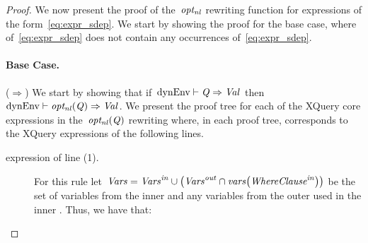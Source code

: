 \begin{proof}
  We now present the proof of the~$\mathit{opt_{nl}}$ rewriting function for expressions of the
  form~\eqref{eq:expr_sdep}.
  We start by showing the proof for the base case, where \ExprSingle of~\eqref{eq:expr_sdep} does not
  contain any occurrences of~\eqref{eq:expr_sdep}.
  \paragraph*{Base Case.}
  \noindent ($\Rightarrow$)
  We start by showing that if~${\textrm{dynEnv}} \vdash \mathit{{Q}_{}} \Rightarrow \mathit{{Val}_{}}$ then~${\textrm{dynEnv}} \vdash \mathit{opt_{nl}}\!\left(\mathit{{Q}_{}}\right)
  \Rightarrow \mathit{{Val}_{}}$.
  We present the proof tree for each of the XQuery core expressions in the~$\mathit{opt_{nl}}\!\left(\mathit{{Q}_{}}\right)$ rewriting where, in
  each proof tree,  corresponds to the XQuery expressions of the following lines.
  \begin{description}
  \item[\LET expression of line (1).] For this rule let~$\mathit{Vars} = {\mathit{\mathit{Vars}}}_{\mathit{}}^{\mathit{in}} \cup \left( {\mathit{\mathit{Vars}}}_{\mathit{}}^{\mathit{out}} \cap
      \mathit{vars}\!\left({\mathit{{\textit{Whe\-re\-Clause}}}}_{\mathit{}}^{\mathit{in}}\right) \right)$ be the set of variables from the inner \SparqlForClause and any
    variables from the outer \SparqlForClause used in the inner \SparqlWhereClause. Thus, we have that:

    \begin{prooftreefunction}
      
      
      

\end{prooftreefunction}
\end{description}
\end{proof}
